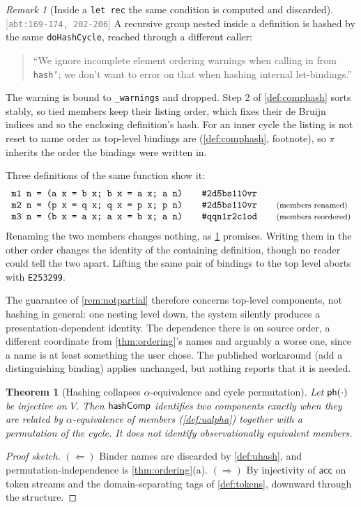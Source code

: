 \documentclass[11pt]{article}
\theoremstyle{definition}
\theoremstyle{plain}
\newtheorem{theorem}{Theorem}[section]
\theoremstyle{remark}
\newtheorem{remark}{Remark}[section]
\newcommand{\src}[1]{{\footnotesize\textcolor{gray}{[\texttt{#1}]}}}
\begin{document}
\begin{remark}[Inside a \texttt{let rec} the same condition is computed and discarded]\label{rem:innercycle}
\src{abt:169-174, 202-206} A recursive group nested inside a definition is hashed by the same
\texttt{doHashCycle}, reached through a different caller:
\begin{quote}\small
``We ignore incomplete element ordering warnings when calling in from \texttt{hash'}; we don't want to
error on that when hashing internal let-bindings.''
\end{quote}
The warning is bound to \texttt{\_warnings} and dropped. Step 2 of \cref{def:comphash} sorts stably,
so tied members keep their listing order, which fixes their de Bruijn indices and so the enclosing
definition's hash. For an inner cycle the listing is not reset to name order as top-level bindings are
(\cref{def:comphash}, footnote), so $\pi$ inherits the order the bindings were written in.

Three definitions of the same function show it:
\[
\begin{array}{l@{\qquad}l@{\qquad}l}
  \texttt{m1 n = (a x = b x;\ b x = a x;\ a n)} & \texttt{\#2d5bs110vr} & \\
  \texttt{m2 n = (p x = q x;\ q x = p x;\ p n)} & \texttt{\#2d5bs110vr} & \just{members renamed} \\
  \texttt{m3 n = (b x = a x;\ a x = b x;\ a n)} & \texttt{\#qqn1r2c1od} & \just{members reordered}
\end{array}
\]
Renaming the two members changes nothing, as \cref{thm:ualpha} promises. Writing them in the other
order changes the identity of the containing definition, though no reader could tell the two apart.
Lifting the same pair of bindings to the top level aborts with \texttt{E253299}.

The guarantee of \cref{rem:notpartial} therefore concerns top-level components, not hashing in
general: one nesting level down, the system silently produces a presentation-dependent identity. The
dependence there is on source order, a different coordinate from \cref{thm:ordering}'s names and
arguably a worse one, since a name is at least something the user chose. The published workaround
(add a distinguishing binding) applies unchanged, but nothing reports that it is needed.
\end{remark}

\begin{theorem}[Hashing collapses $\alpha$-equivalence and cycle permutation]\label{thm:ualpha}
Let $\mathsf{ph}(\cdot)$ be injective on $V$. Then $\mathsf{hashComp}$ identifies two components exactly when they
are related by $\alpha$-equivalence of members (\cref{def:ualpha}) together with a permutation of the
cycle. It does not identify observationally equivalent members.
\end{theorem}
\begin{proof}[Proof sketch]
$(\Leftarrow)$ Binder names are discarded by \cref{def:uhash}, and permutation-independence is
\cref{thm:ordering}(a). $(\Rightarrow)$ By injectivity of $\mathsf{acc}$ on token streams and the
domain-separating tags of \cref{def:tokens}, downward through the structure.
\end{proof}
\end{document}
